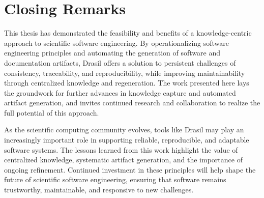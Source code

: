 \section{Closing Remarks}

This thesis has demonstrated the feasibility and benefits of a knowledge-centric
approach to scientific software engineering. By operationalizing
software engineering principles and automating the generation of software
and documentation artifacts, Drasil offers a solution to persistent
challenges of consistency, traceability, and reproducibility, while improving
maintainability through centralized knowledge and regeneration. The work
presented here lays the groundwork for further advances in knowledge capture
and automated artifact generation, and invites continued research and
collaboration to realize the full potential of this approach.

As the scientific computing community evolves, tools like Drasil may play an
increasingly important role in supporting reliable, reproducible, and
adaptable software systems. The lessons learned from this work highlight the
value of centralized knowledge, systematic artifact generation, and the
importance of ongoing refinement. Continued investment in these principles
will help shape the future of scientific software engineering, ensuring that
software remains trustworthy, maintainable, and responsive to new challenges.
